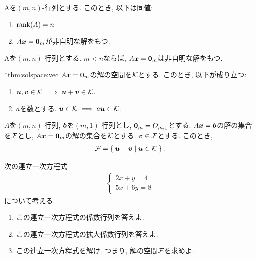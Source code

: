 \begin{prop}
  Aを$(m,n)$-行列とする.
  このとき, 以下は同値:
  \begin{enumerate}
  \item $\operatorname{rank}(A)=n$
  \item $A\boldsymbol{x}=\boldsymbol{0}_m$が非自明な解をもつ.
  \end{enumerate}
\end{prop}

\begin{cor}
  Aを$(m,n)$-行列とする.
  $m<n$ならば,
  $A\boldsymbol{x}=\boldsymbol{0}_m$は非自明な解をもつ.
\end{cor}

\begin{prop}
  \provelater**{thm:solspace:vec}
  \label{thm:ker:vec}
  $A\boldsymbol{x}=\boldsymbol{0}_m$の解の空間を$\mathcal{K}$とする.
  このとき, 以下が成り立つ:
  \begin{enumerate}
  \item
    $\boldsymbol{u},\boldsymbol{v}\in \mathcal{K}\implies \boldsymbol{u}+\boldsymbol{v}\in\mathcal{K}$.
  \item
    $a$を数とする. $\boldsymbol{u}\in \mathcal{K}\implies a\boldsymbol{u}\in\mathcal{K}$.
  \end{enumerate}
\end{prop}

\begin{theorem}
  $A$を$(m,n)$-行列,
  $\boldsymbol{b}$を$(m,1)$-行列とし,
  $\boldsymbol{0}_m=O_{m,1}$とする.
  $A\boldsymbol{x}=\boldsymbol{b}$の解の集合を$\mathcal{F}$とし,
  $A\boldsymbol{x}=\boldsymbol{0}_m$の解の集合を$\mathcal{K}$とする.
  $\boldsymbol{v}\in \mathcal{F}$とする.
  このとき,
  \begin{align*}
    \mathcal{F}=\Set{\boldsymbol{u}+\boldsymbol{v}|\boldsymbol{u}\in \mathcal{K}}.
  \end{align*}
\end{theorem}


\begin{quiz}
  \label{quiz:3:2}
  次の連立一次方程式
  \begin{align*}
    \begin{cases}
      2x+y=4\\
      5x+6y=8
      \end{cases}
  \end{align*}
  について考える.
  \begin{enumerate}
    \item この連立一次方程式の係数行列を答えよ.
    \item この連立一次方程式の拡大係数行列を答えよ.
    \item この連立一次方程式を解け.
      つまり, 解の空間$\mathcal{F}$を求めよ.
  \end{enumerate}
\end{quiz}

